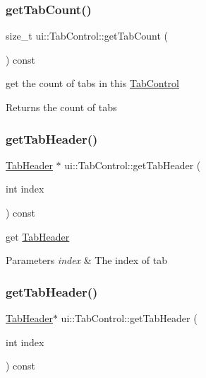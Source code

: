 \subsubsection{\texorpdfstring{get\+Tab\+Count()}{getTabCount()}\hspace{0.1cm}{\footnotesize\ttfamily [2/2]}}
{\footnotesize\ttfamily size\+\_\+t ui\+::\+Tab\+Control\+::get\+Tab\+Count (\begin{DoxyParamCaption}{ }\end{DoxyParamCaption}) const}

get the count of tabs in this \hyperlink{classui_1_1TabControl}{Tab\+Control} \begin{DoxyReturn}{Returns}
the count of tabs 
\end{DoxyReturn}
\mbox{\label{classui_1_1TabControl_ae3313d78b4e18c07b4e77517a2bed36c}} 
\subsubsection{\texorpdfstring{get\+Tab\+Header()}{getTabHeader()}\hspace{0.1cm}{\footnotesize\ttfamily [1/2]}}
{\footnotesize\ttfamily \hyperlink{classui_1_1TabHeader}{Tab\+Header} $\ast$ ui\+::\+Tab\+Control\+::get\+Tab\+Header (\begin{DoxyParamCaption}\item[{int}]{index }\end{DoxyParamCaption}) const}

get \hyperlink{classui_1_1TabHeader}{Tab\+Header} 
\begin{DoxyParams}{Parameters}
{\em index} & The index of tab \\
\hline
\end{DoxyParams}
\mbox{\label{classui_1_1TabControl_a1cb2ef78d7a3ec78979b0e73432964d7}} 
\subsubsection{\texorpdfstring{get\+Tab\+Header()}{getTabHeader()}\hspace{0.1cm}{\footnotesize\ttfamily [2/2]}}
{\footnotesize\ttfamily \hyperlink{classui_1_1TabHeader}{Tab\+Header}$\ast$ ui\+::\+Tab\+Control\+::get\+Tab\+Header (\begin{DoxyParamCaption}\item[{int}]{index }\end{DoxyParamCaption}) const}

